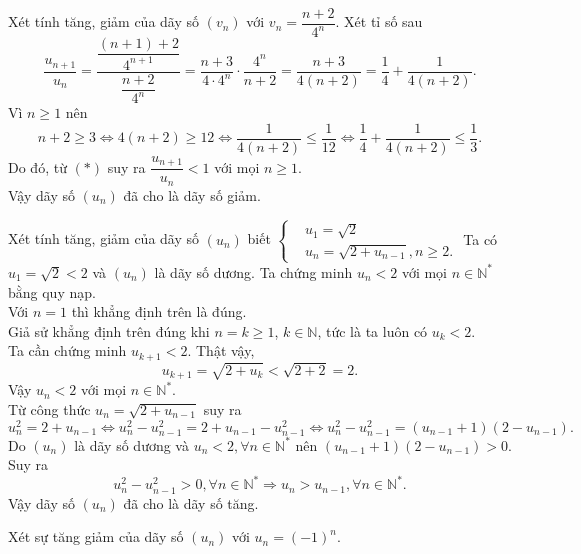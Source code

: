 \begin{bt}%
	Xét tính tăng, giảm của dãy số $(v_n)$ với $v_n=\dfrac{n+2}{4^n}$.
\loigiai
{
	Xét tỉ số sau
	\[\dfrac{u_{n+1}}{u_n} = \dfrac{\dfrac{(n+1)+2}{4^{n+1}}}{\dfrac{n+2}{4^n}} = \dfrac{n+3}{4\cdot 4^n}\cdot \dfrac{4^n}{n+2} = \dfrac{n+3}{4(n+2)} = \dfrac{1}{4}+\dfrac{1}{4(n+2)}.\tag{$*$}\]
	Vì $n \geq 1$ nên
	\[n+2 \geq 3 \Leftrightarrow 4(n+2)\geq 12 \Leftrightarrow \dfrac{1}{4(n+2)} \leq \dfrac{1}{12} \Leftrightarrow \dfrac{1}{4}+\dfrac{1}{4(n+2)}\leq \dfrac{1}{3}.\]
	Do đó, từ $(*)$ suy ra $\dfrac{u_{n+1}}{u_n}<1$ với mọi $n\geq 1$.\\
	Vậy dãy số $(u_n)$ đã cho là dãy số giảm.
}
\end{bt}

\begin{bt}%
	Xét tính tăng, giảm của dãy số $(u_n)$ biết $\left\{\begin{aligned}&u_1=\sqrt{2} \\&u_n=\sqrt{2+u_{n-1}}, n\geq 2.\end{aligned}\right.$
	\loigiai
	{
		Ta có $u_1=\sqrt{2}<2$ và $(u_n)$ là dãy số dương. Ta chứng minh $u_n<2$ với mọi $n\in \mathbb{N}^*$ bằng quy nạp.\\
		Với $n=1$ thì khẳng định trên là đúng.\\
		Giả sử khẳng định trên đúng khi $n=k\geq 1$, $k\in \mathbb{N}$, tức là ta luôn có $u_k<2$.\\
		Ta cần chứng minh $u_{k+1}<2$. Thật vậy,
		\[u_{k+1}=\sqrt{2+u_k}<\sqrt{2+2}=2.\]
		Vậy $u_n<2$ với mọi $n\in \mathbb{N}^*$.\\
		Từ công thức $u_n=\sqrt{2+u_{n-1}}$ suy ra
		\[u_n^2=2+u_{n-1} \Leftrightarrow u_n^2-u_{n-1}^2 = 2+u_{n-1}-u_{n-1}^2 \Leftrightarrow u_n^2-u_{n-1}^2 = (u_{n-1}+1)(2-u_{n-1}).\]
		Do $(u_n)$ là dãy số dương và $u_n<2, \forall n\in \mathbb{N}^*$ nên $(u_{n-1}+1)(2-u_{n-1})>0$. Suy ra
		\[u_n^2-u_{n-1}^2>0, \forall n\in \mathbb{N}^* \Rightarrow u_n>u_{n-1}, \forall n\in \mathbb{N}^*.\]
		Vậy dãy số $(u_n)$ đã cho là dãy số tăng.
	}
\end{bt}

\begin{bt}%

	Xét sự tăng giảm của dãy số $(u_n)$ với $u_n=(-1)^n$.
\end{bt}

